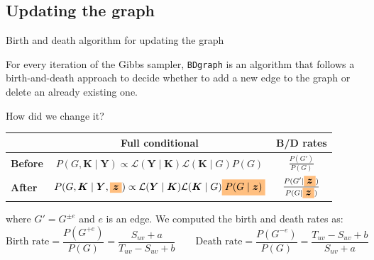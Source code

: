 \subsection{Updating the graph}
\begin{frame}{Birth and death algorithm for updating the graph}

    For every iteration of the Gibbs sampler, \texttt{BDgraph} is an algorithm that follows a \alert{birth-and-death} approach to decide whether to add a new edge to the graph or delete an already existing one.
    
    How did we change it?
    \begin{table}[tb]
        \centering
        \begin{tabular}{l|c|c}
        & Full conditional & B/D rates \\ %
        \hline
        \textbf{Before} & $P(G,\bm{K} \mid \bm{Y}) \propto \mathcal{L}(\bm{Y} \mid \bm{K})\mathcal{L} (\bm{K} \mid {G})P(G)$ & $\frac{P(G')}{P(G)}$ \\
        \hline
        \textbf{After}  & $P(G,\bm{K} \mid \bm{Y}, \highlight{\bm{z}}) \propto \mathcal{L}(\bm{Y} \mid \bm{K})\mathcal{L}(\bm{K} \mid {G})\highlight{P(G \mid \bm{z})}$ & $\frac{P(G' \mid \highlight{\bm{z}})}{P(G \mid \highlight{\bm{z}})}$ \\
        \hline
        \end{tabular}
    \end{table}
    where $G' = G^{\pm e}$ and $e$ is an edge.
    We computed the birth and death rates as:
    \[
        \text{Birth rate} = \frac{P(G^{+ e})}{P(G)} = \frac{S_{uv} + a}{T_{uv} - S_{uv} + b} \qquad \text{Death rate} =\frac{P(G^{- e})}{P(G)} = \frac{T_{uv} - S_{uv} + b}{S_{uv} + a}
    \]
    
\end{frame}


